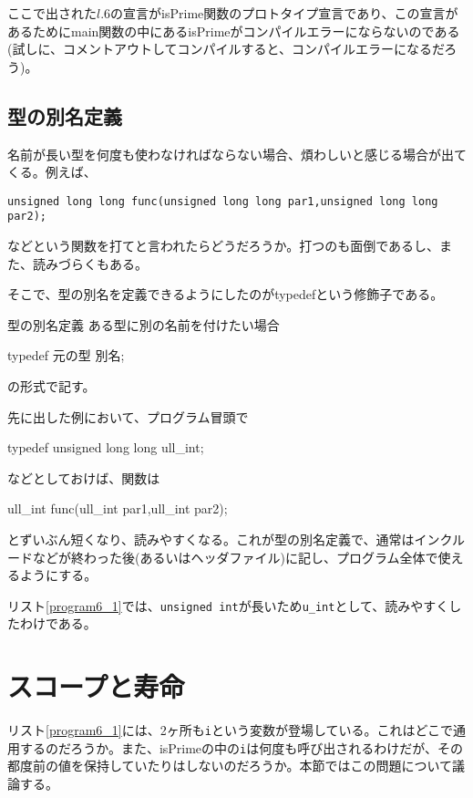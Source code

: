 ここで出された$l$.6の宣言がisPrime関数のプロトタイプ宣言であり、この宣言があるためにmain関数の中にあるisPrimeがコンパイルエラーにならないのである(試しに、コメントアウトしてコンパイルすると、コンパイルエラーになるだろう)。

\subsection{型の別名定義}
名前が長い型を何度も使わなければならない場合、煩わしいと感じる場合が出てくる。例えば、
\begin{verbatim}
unsigned long long func(unsigned long long par1,unsigned long long par2);
\end{verbatim}
などという関数を打てと言われたらどうだろうか。打つのも面倒であるし、また、読みづらくもある。

そこで、型の別名を定義できるようにしたのがtypedefという修飾子である。
\begin{itembox}[l]{型の別名定義}
ある型に別の名前を付けたい場合
\begin{code}
typedef 元の型 別名;
\end{code}
の形式で記す。
\end{itembox}

先に出した例において、プログラム冒頭で
\begin{code}
typedef unsigned long long ull_int;
\end{code}
などとしておけば、関数は
\begin{code}
ull_int func(ull_int par1,ull_int par2);
\end{code}
とずいぶん短くなり、読みやすくなる。これが型の別名定義で、通常はインクルードなどが終わった後(あるいはヘッダファイル)に記し、プログラム全体で使えるようにする。

リスト\ref{program6_1}では、\verb|unsigned int|が長いため\verb|u_int|として、読みやすくしたわけである。

\section{スコープと寿命}
リスト\ref{program6_1}には、2ヶ所も\verb|i|という変数が登場している。これはどこで通用するのだろうか。また、isPrimeの中の\verb|i|は何度も呼び出されるわけだが、その都度前の値を保持していたりはしないのだろうか。本節ではこの問題について議論する。
